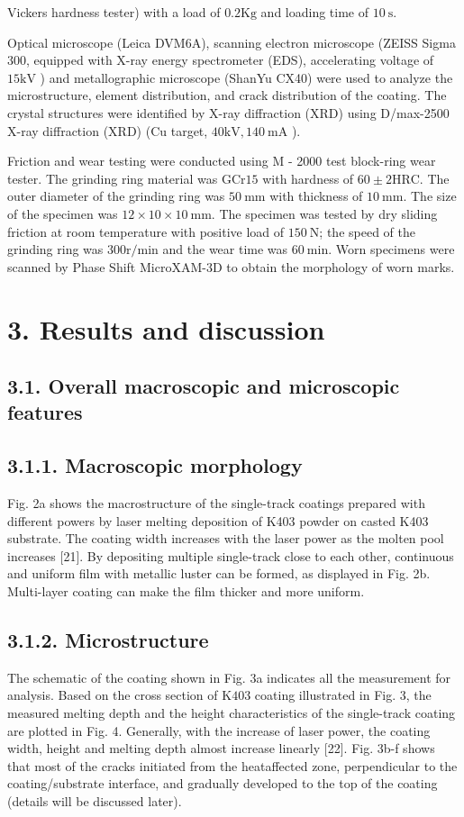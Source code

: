 \documentclass[10pt]{article}
\begin{document}
Vickers hardness tester) with a load of $0.2 \mathrm{Kg}$ and loading time of $10 \mathrm{~s}$.

Optical microscope (Leica DVM6A), scanning electron microscope (ZEISS Sigma 300, equipped with X-ray energy spectrometer (EDS), accelerating voltage of $15 \mathrm{kV}$ ) and metallographic microscope (ShanYu CX40) were used to analyze the microstructure, element distribution, and crack distribution of the coating. The crystal structures were identified by X-ray diffraction (XRD) using D/max-2500 X-ray diffraction (XRD) (Cu target, $40 \mathrm{kV}, 140 \mathrm{~mA}$ ).

Friction and wear testing were conducted using M - 2000 test block-ring wear tester. The grinding ring material was $\mathrm{GCr} 15$ with hardness of $60 \pm 2 \mathrm{HRC}$. The outer diameter of the grinding ring was $50 \mathrm{~mm}$ with thickness of $10 \mathrm{~mm}$. The size of the specimen was $12 \times 10 \times 10 \mathrm{~mm}$. The specimen was tested by dry sliding friction at room temperature with positive load of $150 \mathrm{~N}$; the speed of the grinding ring was $300 \mathrm{r} / \mathrm{min}$ and the wear time was $60 \mathrm{~min}$. Worn specimens were scanned by Phase Shift MicroXAM-3D to obtain the morphology of worn marks.

\section*{3. Results and discussion}
\subsection*{3.1. Overall macroscopic and microscopic features}
\subsection*{3.1.1. Macroscopic morphology}
Fig. 2a shows the macrostructure of the single-track coatings prepared with different powers by laser melting deposition of K403 powder on casted K403 substrate. The coating width increases with the laser power as the molten pool increases [21]. By depositing multiple single-track close to each other, continuous and uniform film with metallic luster can be formed, as displayed in Fig. 2b. Multi-layer coating can make the film thicker and more uniform.

\subsection*{3.1.2. Microstructure}
The schematic of the coating shown in Fig. 3a indicates all the measurement for analysis. Based on the cross section of $\mathrm{K} 403$ coating illustrated in Fig. 3, the measured melting depth and the height characteristics of the single-track coating are plotted in Fig. 4. Generally, with the increase of laser power, the coating width, height and melting depth almost increase linearly [22]. Fig. 3b-f shows that most of the cracks initiated from the heataffected zone, perpendicular to the coating/substrate interface, and gradually developed to the top of the coating (details will be discussed later).
\end{document}
